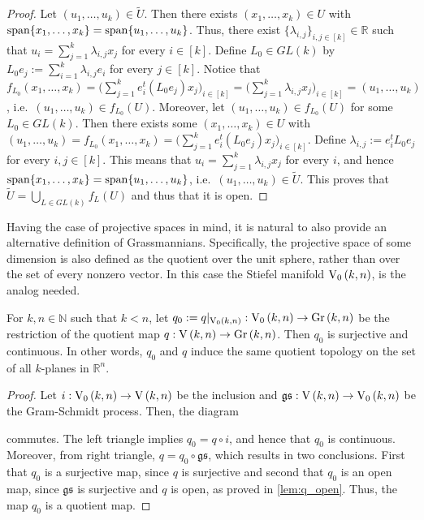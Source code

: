 \begin{proof}
Let $(u_1,\ldots,u_k)\in\tilde{U}$. Then there exists $(x_1,\ldots,x_k)\in U$ with $\mathrm{span}\{x_1,\ldots,x_k\}=\mathrm{span}\{u_1,\ldots,u_k\}$. Thus, there exist $\{\lambda_{i,j}\}_{i,j\in[k]}\in\mathbb{R}$ such that $u_i=\sum_{j=1}^k\lambda_{i,j}x_j$ for every $i\in[k]$. Define $L_0\in GL(k)$ by $L_0e_j:=\sum_{i=1}^k\lambda_{i,j}e_i$ for every $j\in[k]$. Notice that $f_{L_0}(x_1,\ldots,x_k)=\big(\sum_{j=1}^ke_i^t(L_0e_j)x_j\big)_{i\in[k]}=\big(\sum_{j=1}^k\lambda_{i,j}x_j\big)_{i\in[k]}=(u_1,\ldots,u_k)$, i.e.\ $(u_1,\ldots,u_k)\in f_{L_0}(U)$. Moreover, let $(u_1,\ldots,u_k)\in f_{L_0}(U)$ for some $L_0\in GL(k)$. Then there exists some $(x_1,\ldots,x_k)\in U$ with $(u_1,\ldots,u_k)=f_{L_0}(x_1,\ldots,x_k)=\big(\sum_{j=1}^ke_i^t(L_0e_j)x_j\big)_{i\in[k]}$. Define $\lambda_{i,j}:=e_i^tL_0e_j$ for every $i,j\in[k]$. This means that $u_i=\sum_{j=1}^k\lambda_{i,j}x_j$ for every $i$, and hence $\mathrm{span}\{x_1,\ldots,x_k\}=\mathrm{span}\{u_1,\ldots,u_k\}$, i.e.\ $(u_1,\ldots,u_k)\in\tilde{U}$. This proves that $\tilde{U}=\bigcup_{L\in GL(k)}f_L(U)$ and thus that it is open.
\end{proof}

Having the case of projective spaces in mind, it is natural to also provide an alternative definition of Grassmannians.
Specifically, the projective space of some dimension is also defined as the quotient over the unit sphere, rather than over the set of every nonzero vector.
In this case the Stiefel manifold $\StO{k}{n}$, is the analog needed.

\begin{proposition} For $k,n\in\mathbb{N}$ such that $k<n$, let $q_0:=q|_{\StO{k}{n}}:\StO{k}{n}\to\Gr{k}{n}$ be the restriction of the quotient map $q:\St{k}{n}\to\Gr{k}{n}$. Then $q_0$ is surjective and continuous. In other words, $q_0$ and $q$ induce the same quotient topology on the set of all $k$-planes in $\mathbb{R}^n$.
\end{proposition}
\begin{proof}
Let $i:\StO{k}{n}\to\St{k}{n}$ be the inclusion and $\mathfrak{gs}:\St{k}{n}\to\StO{k}{n}$ be the Gram-Schmidt process. Then, the diagram
\begin{center}
\end{center}
commutes. The left triangle implies $q_0=q\circ i$, and hence that $q_0$ is continuous. Moreover, from right triangle, $q=q_0\circ\mathfrak{gs}$, which results in two conclusions. First that $q_0$ is a surjective map, since $q$ is surjective and second that $q_0$ is an open map, since $\mathfrak{gs}$ is surjective and $q$ is open, as proved in \ref{lem:q_open}. Thus, the map $q_0$ is a quotient map.
\end{proof}

